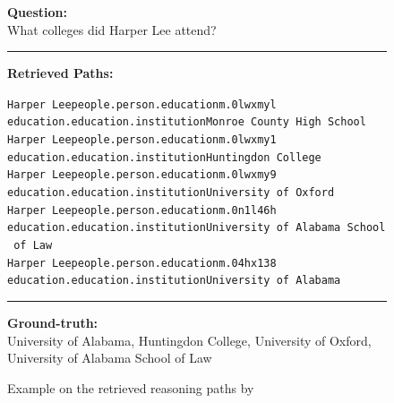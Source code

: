 \begin{figure}[t]
\begin{tcolorbox}[colback=gray!5!white,
                  colframe=gray!75!black,
                  title=WEBQSP-WebQTest-928]
\scriptsize

\textbf{Question:}\\
What colleges did Harper Lee attend?

\rule{\linewidth}{0.4pt}

\textbf{Retrieved Paths:}\\[2pt]
{\raggedright
\texttt{Harper Lee\patharrow people.person.education\patharrow m.0lwxmyl\patharrow \\  education.education.institution\patharrow Monroe County High School}\\[6pt]

\texttt{Harper Lee\patharrow people.person.education\patharrow m.0lwxmy1\patharrow \\  education.education.institution\patharrow Huntingdon College}\\[6pt]

\texttt{Harper Lee\patharrow people.person.education\patharrow m.0lwxmy9\patharrow  \\ education.education.institution\patharrow University of Oxford}\\[6pt]

\texttt{Harper Lee\patharrow people.person.education\patharrow m.0n1l46h\patharrow \\  education.education.institution\patharrow University of Alabama School of Law}\\[6pt]

\texttt{Harper Lee\patharrow people.person.education\patharrow m.04hx138\patharrow \\  education.education.institution\patharrow University of Alabama}\\[6pt]

\par}

\rule{\linewidth}{0.4pt}

\textbf{Ground-truth:}\\
University of Alabama, Huntingdon College, University of Oxford, University of Alabama School of Law

\end{tcolorbox}
\caption{Example on the retrieved reasoning paths by \proj}
\label{fig:example2}
\end{figure}


